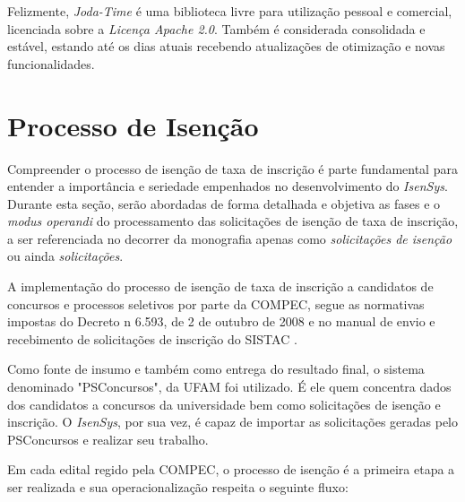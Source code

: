 \documentclass[
	12pt,			%
	openright,		%
	oneside,	
	a4paper,		%
	english,		%
	brazil			%
]{abntex2/abntex2}  %
\begin{document}
			Felizmente, \textit{Joda-Time} é uma biblioteca livre para utilização pessoal e comercial, licenciada sobre a \textit{Licença Apache 2.0}. Também é considerada consolidada e estável, estando até os dias atuais recebendo atualizações de otimização e novas funcionalidades.

		\section{Processo de Isenção} \label{isencao}
		
			Compreender o processo de isenção de taxa de inscrição é parte fundamental para entender a importância e seriedade empenhados no desenvolvimento do \textit{IsenSys}. Durante esta seção, serão abordadas de forma detalhada e objetiva as fases e o \textit{modus operandi} do processamento das solicitações de isenção de taxa de inscrição, a ser referenciada no decorrer da monografia apenas como \textit{solicitações de isenção} ou ainda \textit{solicitações}.
		
			A implementação do processo de isenção de taxa de inscrição a candidatos de concursos e processos seletivos por parte da COMPEC, segue as normativas impostas do Decreto n{\textordmasculine} 6.593, de 2 de outubro de 2008 \cite{cadunico-decreto} e no manual de envio e recebimento de solicitações de inscrição do SISTAC \cite{sistac-formatos}.
			
			Como fonte de insumo e também como entrega do resultado final, o sistema denominado "PSConcursos", da UFAM foi utilizado. É ele quem concentra dados dos candidatos a concursos da universidade bem como solicitações de isenção e inscrição. O \textit{IsenSys}, por sua vez, é capaz de importar as solicitações geradas pelo PSConcursos e realizar seu trabalho.
			
			Em cada edital regido pela COMPEC, o processo de isenção é a primeira etapa a ser realizada e sua operacionalização respeita o seguinte fluxo:
			
\end{document}
